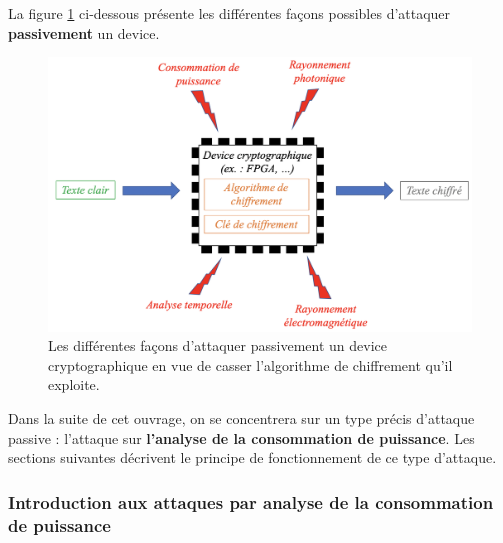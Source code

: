 \documentclass[oneside]{book}
\begin{document}
\hspace{-0.5 cm}La figure \ref{fig:attackpassive} ci-dessous présente les différentes façons possibles d'attaquer \textbf{passivement} un device.
\begin{figure}[htbp]
    \centering
    \includegraphics[scale=0.4]{image/attackpassive}
    \caption{Les différentes façons d'attaquer passivement un device cryptographique en vue de casser l'algorithme de chiffrement qu'il exploite.}
    \label{fig:attackpassive}
\end{figure}

Dans la suite de cet ouvrage, on se concentrera sur un type précis d'attaque passive : l'attaque sur \textbf{l'analyse de la consommation de puissance}. Les sections suivantes décrivent le principe de fonctionnement de ce type d'attaque. 

\subsubsection{Introduction aux attaques par analyse de la consommation de puissance}
\label{subsec:CPAIntroduc}
\end{document}
